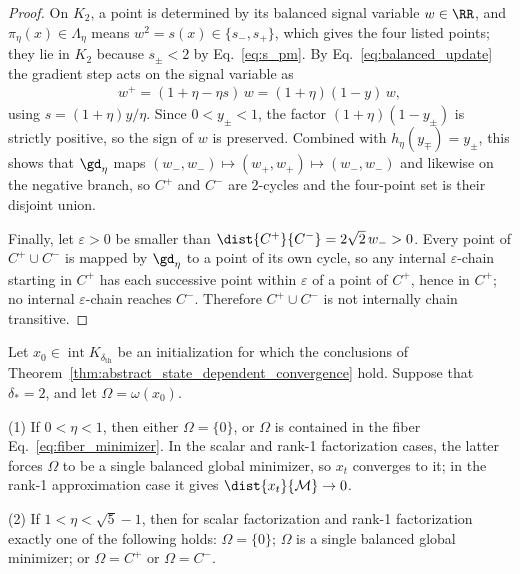 \documentclass{article}
\begin{document}
\begin{proof}
On $K_2$, a point is determined by its balanced signal variable $w\in\RR$, and
$\pi_\eta(x)\in\Lambda_\eta$ means $w^2=s(x)\in\{s_-,s_+\}$, which gives the
four listed points; they lie in $K_2$ because $s_\pm<2$ by
Eq.~\eqref{eq:s_pm}. By Eq.~\eqref{eq:balanced_update} the gradient step acts on
the signal variable as
\begin{align}
    w^+=(1+\eta-\eta s)\,w=(1+\eta)(1-y)\,w ,
\end{align}
using $s=(1+\eta)y/\eta$. Since $0<y_\pm<1$, the factor $(1+\eta)(1-y_\pm)$ is
strictly positive, so the sign of $w$ is preserved. Combined with
$h_\eta(y_\mp)=y_\pm$, this shows that $\gd_\eta$ maps $(w_-,w_-)\mapsto(w_+,w_+)\mapsto(w_-,w_-)$
and likewise on the negative branch, so $C^+$ and $C^-$ are $2$-cycles and the
four-point set is their disjoint union.

Finally, let $\varepsilon>0$ be smaller than $\dist{C^+}{C^-}=2\sqrt2\,w_->0$.
Every point of $C^+\cup C^-$ is mapped by $\gd_\eta$ to a point of its own
cycle, so any internal $\varepsilon$-chain starting in $C^+$ has each successive
point within $\varepsilon$ of a point of $C^+$, hence in $C^+$; no internal
$\varepsilon$-chain reaches $C^-$. Therefore $C^+\cup C^-$ is not internally
chain transitive.
\end{proof}

\begin{proposition}
\label{prop:terminal_omega_classification}
Let $x_0\in\operatorname{int}K_{\delta_{\mathrm{th}}}$ be an initialization for
which the conclusions of
Theorem~\ref{thm:abstract_state_dependent_convergence} hold. Suppose that
$\delta_\ast=2$, and let $\Omega=\omega(x_0)$.

(1) If $0<\eta<1$, then either $\Omega=\{0\}$, or $\Omega$ is contained in the
fiber Eq.~\eqref{eq:fiber_minimizer}. In the scalar and rank-1 factorization
cases, the latter forces $\Omega$ to be a single balanced global minimizer, so
$x_t$ converges to it; in the rank-1 approximation case it gives
$\dist{x_t}{\mathcal M}\to0$.

(2) If $1<\eta<\sqrt5-1$, then for scalar factorization and rank-1
factorization exactly one of the following holds: $\Omega=\{0\}$; $\Omega$ is a
single balanced global minimizer; or $\Omega=C^+$ or $\Omega=C^-$.
\end{proposition}
\end{document}
